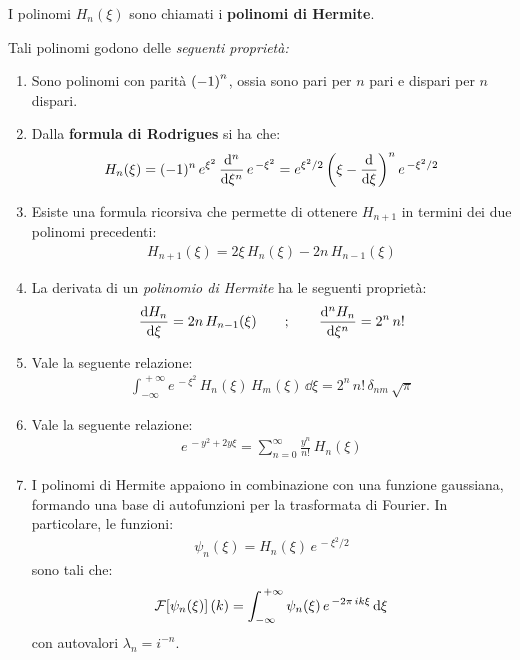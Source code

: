 \begin{nb}
	I polinomi $H_n(\xi)$ sono chiamati i \textbf{polinomi di Hermite}.
\end{nb}

	Tali polinomi godono delle \textit{seguenti proprietà:}
	
\begin{enumerate}[label=\arabic*)]
	\item Sono polinomi con parità $\qty(-1)^n$, ossia sono pari per $n$ pari e dispari per $n$ dispari.
	
	\item Dalla \textbf{formula di Rodrigues} si ha che:
	\begin{align*}
		H_n(\xi) = (-1)^n \, e^{\xi^2} \, \dv[n]{\xi} \, e^{\, -\xi^2} = e^{\xi^2/2} \, \qty(\xi - \dv{\xi})^n \, e^{\, - \xi^2/2}
	\end{align*}
	
	\item Esiste una formula ricorsiva che permette di ottenere $H_{n+1}$ in termini dei due polinomi precedenti:
	\begin{align*}
		H_{n+1}(\xi) = 2 \xi \, H_n(\xi) - 2n \, H_{n-1}(\xi)
	\end{align*}
	
	\item La derivata di un \textit{polinomio di Hermite} ha le seguenti proprietà:
	\begin{align*}
		\dv{H_n}{\xi} = 2n \, H_{n-1}(\xi)  \qquad ; \qquad \dv[n]{H_n}{\xi} = 2^n \, n!
	\end{align*}
	
	\item Vale la seguente relazione:
	\begin{align*}
		\int_{-\infty}^{\, + \infty} e^{\, - \xi^2} \, H_n(\xi) \, H_m(\xi) \, \dd \xi = 2^n \, n! \, \delta_{nm} \, \sqrt{\pi}
	\end{align*}
	
	\item Vale la seguente relazione:
	\begin{align*}
		e^{\, -y^2 + 2y\xi} = \sum_{n=0}^{\infty} \frac{y^n}{n!} \, H_n(\xi)
	\end{align*}
	
	\item I polinomi di Hermite appaiono in combinazione con una funzione gaussiana, formando una base di autofunzioni per la trasformata di Fourier. In particolare, le funzioni:
	\begin{align*}
		\psi_n(\xi) = H_n(\xi) \, e^{\, - \xi^2/2 }
	\end{align*}
		sono tali che:
	\begin{align*}
		\mathcal{F}\qty[\psi_n(\xi)](k) = \int_{-\infty}^{\, +\infty} \psi_n(\xi) \, e^{\, -2\pi \, ik\xi} \, \dd \xi
	\end{align*}
		con autovalori $\lambda_n = i^{-n}$.
		
\end{enumerate}

